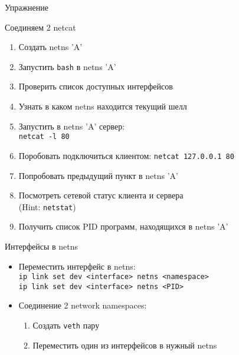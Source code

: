 \begin{frame}[fragile]{Упражнение}

    \begin{block}{Соединяем 2 netcat}
        \begin{enumerate}
            \item Создать netns 'A'
            \item Запустить {\tt bash} в netns 'A'
            \item Проверить список доступных интерфейсов
            \item Узнать в каком netns находится текущий шелл
            \item Запустить в netns 'A' сервер:\\
                {\tt netcat -l 80}
            \item Поробовать подключиться клиентом:
                {\tt netcat 127.0.0.1 80}
            \item Попробовать предыдущий пункт в netns 'A'
            \item Посмотреть сетевой статус клиента и сервера\\
                (Hint: {\tt netstat})
            \item Получить список PID программ, находящихся в netns 'A'
        \end{enumerate}
    \end{block}

\end{frame}

\begin{frame}[fragile]{Интерфейсы в netns}
    \begin{itemize}
        \item Переместить интерфейс в netns:\\
            {\tt ip link set dev <interface> netns <namespace>}\\
            {\tt ip link set dev <interface> netns <PID>}
        \item Соединение 2 network namespaces:
            \begin{enumerate}
                \item Создать {\tt veth} пару
                \item Переместить один из интерфейсов в нужный netns
            \end{enumerate}
    \end{itemize}
\end{frame}

